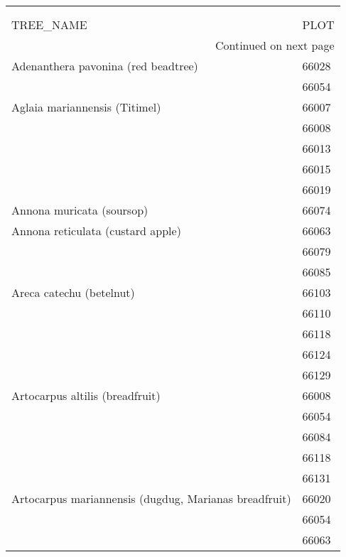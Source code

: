 \begin{longtable}{ll}
\toprule
                                    &       \\
                                    &       \\
\midrule
TREE\_NAME & PLOT \\
\midrule
\endhead
\midrule
\multicolumn{3}{r}{{Continued on next page}} \\
\midrule
\endfoot

\bottomrule
\endlastfoot
\midrule
Adenanthera pavonina (red beadtree) & 66028 \\
                                    & 66054 \\
\midrule
Aglaia mariannensis (Titimel) & 66007 \\
                                    & 66008 \\
                                    & 66013 \\
                                    & 66015 \\
                                    & 66019 \\
\midrule
Annona muricata (soursop) & 66074 \\
\midrule
Annona reticulata (custard apple) & 66063 \\
                                    & 66079 \\
                                    & 66085 \\
\midrule
Areca catechu (betelnut) & 66103 \\
                                    & 66110 \\
                                    & 66118 \\
                                    & 66124 \\
                                    & 66129 \\
\midrule
Artocarpus altilis (breadfruit) & 66008 \\
                                    & 66054 \\
                                    & 66084 \\
                                    & 66118 \\
                                    & 66131 \\
\midrule
Artocarpus mariannensis (dugdug, Marianas breadfruit) & 66020 \\
                                    & 66054 \\
                                    & 66063 \\

\end{longtable}
